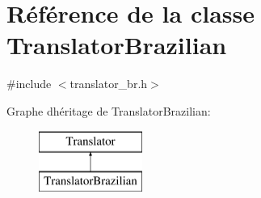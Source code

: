 \hypertarget{class_translator_brazilian}{}\section{Référence de la classe Translator\+Brazilian}
\label{class_translator_brazilian}


{\ttfamily \#include $<$translator\+\_\+br.\+h$>$}

Graphe d\textquotesingle{}héritage de Translator\+Brazilian\+:\begin{figure}[H]
\begin{center}
\leavevmode
\includegraphics[height=2.000000cm]{class_translator_brazilian}
\end{center}
\end{figure}
